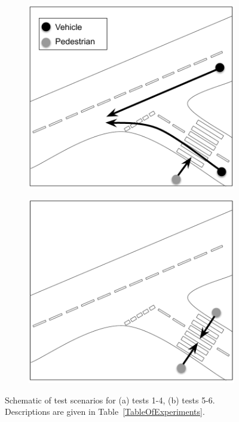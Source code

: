 \documentclass[letterpaper, 10 pt, journal, twoside]{IEEEtran}
\begin{document}
\begin{figure}[!t]
    \centering
    \begin{subfigure}{.24\textwidth}
        \includegraphics[width=1\textwidth]{Other/Figures/TestCasesDiagramV2_a.pdf}
        \caption{}
        \label{Test_a}
    \end{subfigure}
    \begin{subfigure}{.24\textwidth}
        \includegraphics[width=1\textwidth]{Other/Figures/TestCasesDiagramV2_b.pdf}
        \caption{}
        \label{Test_b}
    \end{subfigure}
    \caption{Schematic of test scenarios for (a) tests 1-4, (b) tests 5-6. Descriptions are given in Table~\ref{TableOfExperiments}.}
\end{figure}
\end{document}

